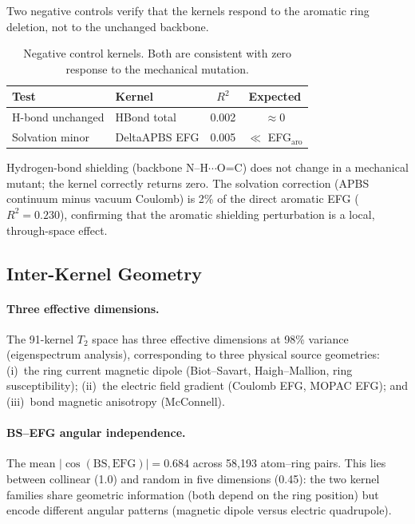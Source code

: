 Two negative controls verify that the kernels respond to the aromatic
ring deletion, not to the unchanged backbone.

\begin{table}[htbp]
  \centering
  \caption{Negative control kernels.  Both are consistent with zero
    response to the mechanical mutation.}
  \label{tab:controls}
  \begin{tabular}{llcc}
    \toprule
    Test & Kernel & $R^2$ & Expected \\
    \midrule
    H-bond unchanged   & HBond total    & 0.002 & ${\approx}0$ \\
    Solvation minor    & DeltaAPBS EFG  & 0.005 & $\ll$ EFG$_{\text{aro}}$ \\
    \bottomrule
  \end{tabular}
\end{table}

Hydrogen-bond shielding (backbone N--H$\cdots$O=C) does not change in a
mechanical mutant; the kernel correctly returns zero.  The solvation
correction (APBS continuum minus vacuum Coulomb) is 2\% of the direct
aromatic EFG ($R^2 = 0.230$), confirming that the aromatic shielding
perturbation is a local, through-space effect.


\subsection{Inter-Kernel Geometry}
\label{ssec:inter-kernel}

\paragraph{Three effective dimensions.}
The 91-kernel $T_2$ space has three effective dimensions at 98\%
variance (eigenspectrum analysis), corresponding to three physical
source geometries: (i)~the ring current magnetic dipole (Biot--Savart,
Haigh--Mallion, ring susceptibility); (ii)~the electric field gradient
(Coulomb EFG, MOPAC EFG); and (iii)~bond magnetic anisotropy
(McConnell).

\paragraph{BS--EFG angular independence.}
The mean $\lvert\cos(\text{BS}, \text{EFG})\rvert = 0.684$ across
58{,}193 atom--ring pairs.  This lies between collinear (1.0) and
random in five dimensions (0.45): the two kernel families share
geometric information (both depend on the ring position) but encode
different angular patterns (magnetic dipole versus electric quadrupole).

